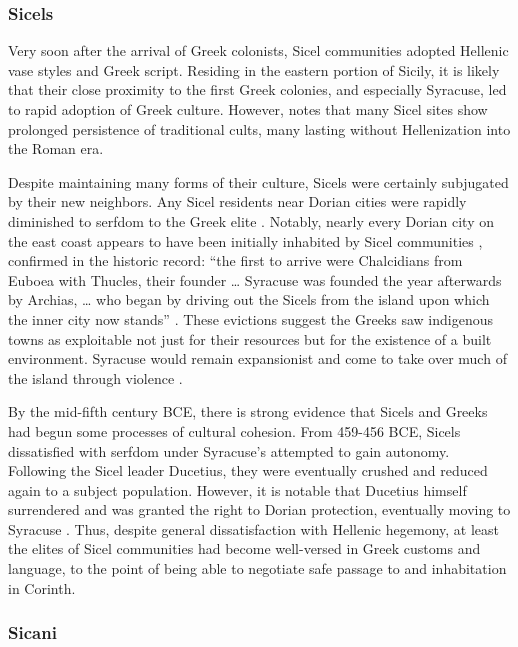 \documentclass[american]{../../../coursework}
\begin{document}
\subsubsection{Sicels}

Very soon after the arrival of Greek colonists, Sicel communities adopted
Hellenic vase styles and Greek script. Residing in the eastern portion of
Sicily, it is likely that their close proximity to the first Greek colonies,
and especially Syracuse, led to rapid adoption of Greek culture. However,
\textcite{Hol91} notes that many Sicel sites show prolonged persistence of
traditional cults, many lasting without Hellenization into the Roman era.

Despite maintaining many forms of their culture, Sicels were certainly
subjugated by their new neighbors. Any Sicel residents near Dorian cities were
rapidly diminished to serfdom to the Greek elite \parencite{Fin83}. Notably,
nearly every Dorian city on the east coast appears to have been initially
inhabited by Sicel communities \parencite{Boa80}, confirmed in the historic
record: ``the first to arrive were Chalcidians from Euboea with Thucles, their
founder … Syracuse was founded the year afterwards by Archias, … who began by
driving out the Sicels from the island upon which the inner city now stands''
\parencite[VI.3]{Thucydides}. These evictions suggest the Greeks saw
indigenous towns as exploitable not just for their resources but for the
existence of a built environment. Syracuse would remain expansionist and come
to take over much of the island through violence \parencite{Sjo73}.

By the mid-fifth century BCE, there is strong evidence that Sicels and Greeks
had begun some processes of cultural cohesion. From 459-456 BCE, Sicels
dissatisfied with serfdom under Syracuse's attempted to gain autonomy.
Following the Sicel leader Ducetius, they were eventually crushed and reduced
again to a subject population. However, it is notable that Ducetius himself
surrendered and was granted the right to Dorian protection, eventually moving
to Syracuse \parencite{Hol91}. Thus, despite general dissatisfaction with
Hellenic hegemony, at least the elites of Sicel communities had become
well-versed in Greek customs and language, to the point of being able to
negotiate safe passage to and inhabitation in Corinth.

\subsubsection{Sicani}
\end{document}
